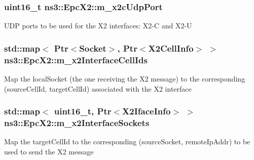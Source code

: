 \subsubsection[{\texorpdfstring{m\+\_\+x2c\+Udp\+Port}{m_x2cUdpPort}}]{\setlength{\rightskip}{0pt plus 5cm}uint16\+\_\+t ns3\+::\+Epc\+X2\+::m\+\_\+x2c\+Udp\+Port\hspace{0.3cm}{\ttfamily [private]}}\hypertarget{classns3_1_1EpcX2_aa2fe730659f6fc10fcd8c44272f96dde}{}\label{classns3_1_1EpcX2_aa2fe730659f6fc10fcd8c44272f96dde}
U\+DP ports to be used for the X2 interfaces\+: X2-\/C and X2-\/U 
\subsubsection[{\texorpdfstring{m\+\_\+x2\+Interface\+Cell\+Ids}{m_x2InterfaceCellIds}}]{\setlength{\rightskip}{0pt plus 5cm}std\+::map$<$ {\bf Ptr}$<${\bf Socket}$>$, {\bf Ptr}$<${\bf X2\+Cell\+Info}$>$ $>$ ns3\+::\+Epc\+X2\+::m\+\_\+x2\+Interface\+Cell\+Ids\hspace{0.3cm}{\ttfamily [private]}}\hypertarget{classns3_1_1EpcX2_ac2a7cd7a712f47a9f429254842762482}{}\label{classns3_1_1EpcX2_ac2a7cd7a712f47a9f429254842762482}
Map the local\+Socket (the one receiving the X2 message) to the corresponding (source\+Cell\+Id, target\+Cell\+Id) associated with the X2 interface 
\subsubsection[{\texorpdfstring{m\+\_\+x2\+Interface\+Sockets}{m_x2InterfaceSockets}}]{\setlength{\rightskip}{0pt plus 5cm}std\+::map$<$ uint16\+\_\+t, {\bf Ptr}$<${\bf X2\+Iface\+Info}$>$ $>$ ns3\+::\+Epc\+X2\+::m\+\_\+x2\+Interface\+Sockets\hspace{0.3cm}{\ttfamily [private]}}\hypertarget{classns3_1_1EpcX2_a0665276228b9b99a52ef6d5e9bdb306d}{}\label{classns3_1_1EpcX2_a0665276228b9b99a52ef6d5e9bdb306d}
Map the target\+Cell\+Id to the corresponding (source\+Socket, remote\+Ip\+Addr) to be used to send the X2 message 
